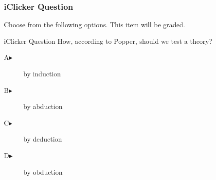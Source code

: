 \begin{frame}
  \frametitle{iClicker Question}
Choose from the following options. This item will be graded.
\begin{block}{iClicker Question}
How, according to Popper, should we test a theory?
\end{block}
\begin{description}
\item[A\hspace{.2in}$\blacktriangleright$] by induction
\item[B\hspace{.2in}$\blacktriangleright$] by abduction
\item[C\hspace{.2in}$\blacktriangleright$] by deduction
\item[D\hspace{.2in}$\blacktriangleright$] by obduction
\end{description}
\end{frame}
